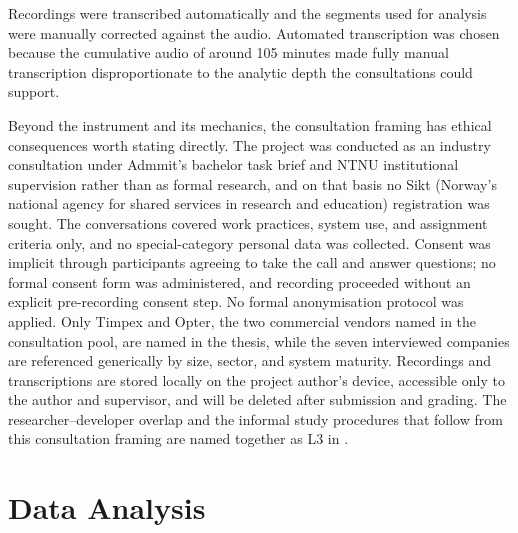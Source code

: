 Recordings were transcribed automatically and the segments used for analysis were manually corrected against the audio. Automated transcription was chosen because the cumulative audio of around 105 minutes made fully manual transcription disproportionate to the analytic depth the consultations could support.

Beyond the instrument and its mechanics, the consultation framing has ethical consequences worth stating directly. The project was conducted as an industry consultation under Admmit's bachelor task brief and NTNU institutional supervision rather than as formal research, and on that basis no Sikt (Norway's national agency for shared services in research and education) registration was sought. The conversations covered work practices, system use, and assignment criteria only, and no special-category personal data was collected. Consent was implicit through participants agreeing to take the call and answer questions; no formal consent form was administered, and recording proceeded without an explicit pre-recording consent step. No formal anonymisation protocol was applied. Only Timpex and Opter, the two commercial vendors named in the consultation pool, are named in the thesis, while the seven interviewed companies are referenced generically by size, sector, and system maturity. Recordings and transcriptions are stored locally on the project author's device, accessible only to the author and supervisor, and will be deleted after submission and grading. The researcher--developer overlap and the informal study procedures that follow from this consultation framing are named together as L3 in .


\section{Data Analysis}
\label{sec:data-analysis}

